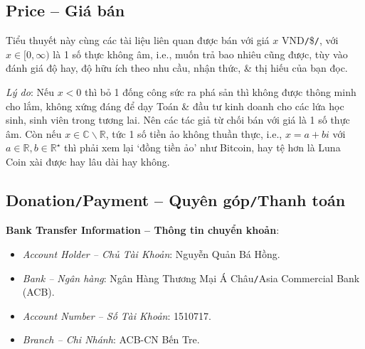 \documentclass[12pt]{article}
\begin{document}
\subsection{Price -- Giá bán}
Tiểu thuyết này cùng các tài liệu liên quan được bán với giá $x$ VND{\tt/}\${\tt/}\texteuro, với $x\in[0,\infty)$ là 1 số thực không âm, i.e., muốn trả bao nhiêu cũng được, tùy vào đánh giá độ hay, độ hữu ích theo nhu cầu, nhận thức, \& thị hiếu của bạn đọc.

{\it Lý do}: Nếu $x < 0$ thì bỏ 1 đống công sức ra phá sản thì không được thông minh cho lắm, không xứng đáng để dạy Toán \& đầu tư kinh doanh cho các lứa học sinh, sinh viên trong tương lai. Nên các tác giả từ chối bán với giá là 1 số thực âm. Còn nếu $x\in\mathbb{C}\backslash\mathbb{R}$, tức 1 số tiền ảo không thuần thực, i.e., $x = a + bi$ với $a\in\mathbb{R},b\in\mathbb{R}^\star$ thì phải xem lại `đồng tiền ảo' như Bitcoin, hay tệ hơn là Luna Coin xài được hay lâu dài hay không.

\subsection{Donation{\tt/}Payment -- Quyên góp{\tt/}Thanh toán}
\noindent\textbf{\textsf{Bank Transfer Information -- Thông tin chuyển khoản}}:
\begin{itemize}
	\item {\it Account Holder -- Chủ Tài Khoản}: {\sc Nguyễn Quản Bá Hồng}.
	\item {\it Bank -- Ngân hàng}: Ngân Hàng Thương Mại Á Châu{\tt/}Asia Commercial Bank (ACB).
	\item {\it Account Number -- Số Tài Khoản}: 1510717.
	\item {\it Branch -- Chi Nhánh}: ACB-CN Bến Tre.
\end{itemize}


\printbibliography[heading=bibintoc]
\label{ref}
	
\end{document}

